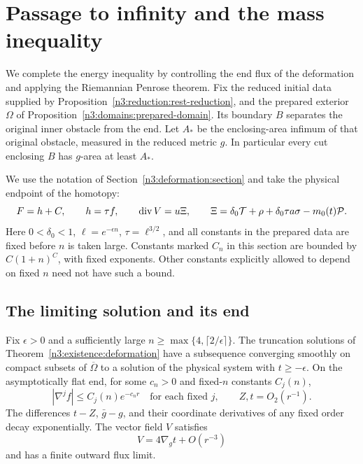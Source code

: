 \section{Passage to infinity and the mass inequality}\label{n3:limit:section}

We complete the energy inequality by controlling the end flux of the
deformation and applying the Riemannian Penrose theorem.
Fix the reduced initial data supplied by
Proposition~\ref{n3:reduction:rest-reduction}, and the prepared exterior
\(\Omega\) of Proposition~\ref{n3:domains:prepared-domain}.
Its boundary \(B\) separates the original inner obstacle from the end.
Let \(A_*\) be the enclosing-area infimum of that original obstacle,
measured in the reduced metric \(g\).
In particular every cut enclosing \(B\) has \(g\)-area at least \(A_*\).

We use the notation of Section~\ref{n3:deformation:section} and take the
physical endpoint of the homotopy:
\[
 F=h+C,\qquad h=\tau f,\qquad
 \operatorname{div} V=u\Xi,\qquad
 \Xi=\delta_0\mathcal T+\rho+\delta_0\tau a\sigma-m_0(t)\mathcal P.
\]
Here \(0<\delta_0<1\), \(\ell=e^{-\epsilon n}\),
\(\tau=\ell^{3/2}\), and all constants in the prepared data are fixed
before \(n\) is taken large. Constants marked \(C_n\) in this section
are bounded by \(C(1+n)^C\), with fixed exponents. Other constants
explicitly allowed to depend on fixed \(n\) need not have such a bound.

\subsection{The limiting solution and its end}

\begin{lemma}\label{n3:limit:end}
Fix \(\epsilon>0\) and a sufficiently large
\(n\ge\max\{4,\lceil2/\epsilon\rceil\}\). The truncation solutions of
Theorem~\ref{n3:existence:deformation} have a subsequence converging
smoothly on compact subsets of \(\overline\Omega\) to a solution of
the physical system with \(t\ge-\epsilon\).
On the asymptotically flat end, for some \(c_n>0\) and fixed-\(n\)
constants \(C_j(n)\),
\[
 |\nabla^j f|\le C_j(n)e^{-c_n r}
 \quad\text{for each fixed }j,\qquad
 Z,t=O_2(r^{-1}).
\]
The differences \(t-Z\), \(\bar g-g\), and their coordinate derivatives
of any fixed order decay exponentially. The vector field \(V\)
satisfies
\begin{equation}\label{n3:limit:V-asymptote}
                    V=4\nabla_g t+O(r^{-3})
\end{equation}
and has a finite outward flux limit.
\end{lemma}

